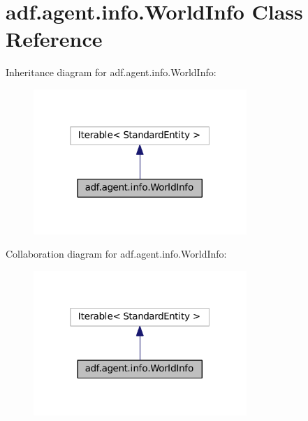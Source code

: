 \hypertarget{classadf_1_1agent_1_1info_1_1WorldInfo}{}\section{adf.\+agent.\+info.\+World\+Info Class Reference}
\label{classadf_1_1agent_1_1info_1_1WorldInfo}


Inheritance diagram for adf.\+agent.\+info.\+World\+Info\+:
\nopagebreak
\begin{figure}[H]
\begin{center}
\leavevmode
\includegraphics[width=229pt]{classadf_1_1agent_1_1info_1_1WorldInfo__inherit__graph}
\end{center}
\end{figure}


Collaboration diagram for adf.\+agent.\+info.\+World\+Info\+:
\nopagebreak
\begin{figure}[H]
\begin{center}
\leavevmode
\includegraphics[width=229pt]{classadf_1_1agent_1_1info_1_1WorldInfo__coll__graph}
\end{center}
\end{figure}
